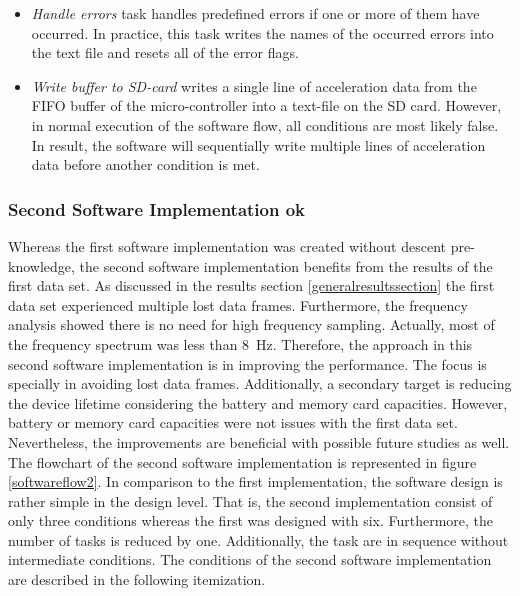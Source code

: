 \documentclass[english,12pt,a4paper,pdftex,elec,utf8]{aaltothesis}
\begin{document}
\begin{itemize}
\item \textit{Handle errors} task handles predefined errors if one or more of them have occurred. In practice, this task writes the names of the occurred errors into the text file and resets all of the error flags.

\item \textit{Write buffer to SD-card} writes a single line of acceleration data from the FIFO buffer of the micro-controller into a text-file on the SD card. However, in normal execution of the software flow, all conditions are most likely false. In result, the software will sequentially write multiple lines of acceleration data before another condition is met.
\end{itemize}





\subsubsection*{Second Software Implementation ok}\label{seconddatasetconfigurations}


Whereas the first software implementation was created without descent pre-knowledge, the second software implementation benefits from the results of the first data set. As discussed in the results section \ref{generalresultssection} the first data set experienced multiple lost data frames. Furthermore, the frequency analysis showed there is no need for high frequency sampling. Actually, most of the frequency spectrum was less than \SI{8}{\hertz}. Therefore, the approach in this second software implementation is in improving the performance. The focus is specially in avoiding lost data frames. Additionally, a secondary target is reducing the device lifetime considering the battery and memory card capacities. However, battery or memory card capacities were not issues with the first data set. Nevertheless, the improvements are beneficial with possible future studies as well. The flowchart of the second software implementation is represented in figure \ref{softwareflow2}. In comparison to the first implementation, the software design is rather simple in the design level. That is, the second implementation consist of only three conditions whereas the first was designed with six. Furthermore, the number of tasks is reduced by one. Additionally, the task are in sequence without intermediate conditions. The conditions of the second software implementation are described in the following itemization.
\end{document}
